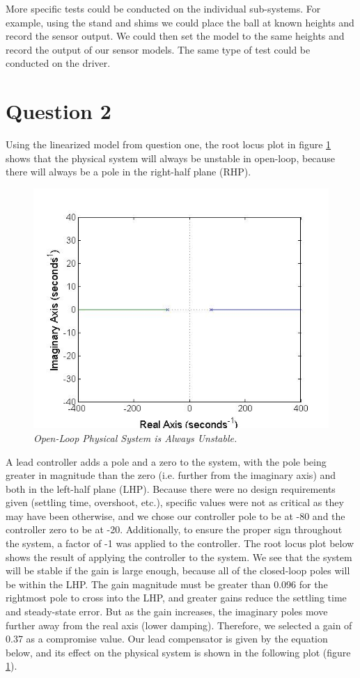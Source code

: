 \documentclass{article}
\theoremstyle{plain}
\theoremstyle{definition}
\theoremstyle{remark}
\begin{document}
More specific tests could be conducted on the individual sub-systems. For example, using the stand and shims we could place the ball at known heights and record the sensor output. We could then set the model to the same heights and record the output of our sensor models. The same type of test could be conducted on the driver. 

\section*{Question 2}
Using the linearized model from question one, the root locus plot in figure \ref{Q2} shows that the physical system will always be unstable in open-loop, because there will always be a pole in the right-half plane (RHP).\\

\begin{figure}[htb]
\begin{center}
\includegraphics[width = 12cm]{FigureA.jpg}
\caption{\emph{Open-Loop Physical System is Always Unstable.}}
\label{Q2}
\end{center}
\end{figure}

A lead controller adds a pole and a zero to the system, with the pole being greater in magnitude than the zero (i.e. further from the imaginary axis) and both in the left-half plane (LHP). Because there were no design requirements given (settling time, overshoot, etc.), specific values were not as critical as they may have been otherwise, and we chose our controller pole to be at -80 and the controller zero to be at -20. Additionally, to ensure the proper sign throughout the system, a factor of -1 was applied to the controller. The root locus plot below shows the result of applying the controller to the system. We see that the system will be stable if the gain is large enough, because all of the closed-loop poles will be within the LHP. The gain magnitude must be greater than 0.096 for the rightmost pole to cross into the LHP, and greater gains reduce the settling time and steady-state error. But as the gain increases, the imaginary poles move further away from the real axis (lower damping). Therefore, we selected a gain of 0.37 as a compromise value. Our lead compensator is given by the equation below, and its effect on the physical system is shown in the following plot (figure \ref{Q2}). 
\end{document}
